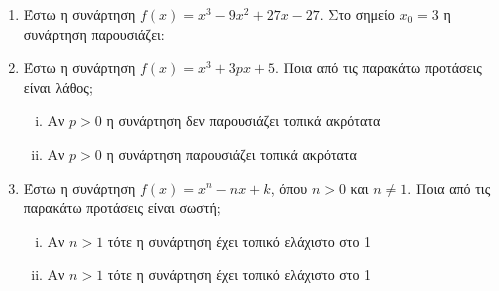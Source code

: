 \begin{enumerate}

  \item Έστω η συνάρτηση $ f(x) = x^{3} - 9x^{2}+27x-27 $. Στο σημείο $ x_{0} = 3 $ η 
    συνάρτηση παρουσιάζει:


  \item Έστω η συνάρτηση $ f(x) = x^{3}+3px+5 $. Ποια από τις παρακάτω προτάσεις είναι 
    λάθος;

    \begin{enumerate}[i)]
      \item Αν $ p>0 $ η συνάρτηση δεν παρουσιάζει τοπικά ακρότατα
      \item Αν $ p>0 $ η συνάρτηση παρουσιάζει τοπικά ακρότατα
    \end{enumerate}

  \item Έστω η συνάρτηση $ f(x) = x^{n}-nx+k $, όπου $ n>0 $ και $ n \neq 1 $. 
    Ποια από τις παρακάτω προτάσεις είναι σωστή;

    \begin{enumerate}[i)]
      \item Αν $ n>1 $ τότε η συνάρτηση έχει τοπικό ελάχιστο στο 1
      \item Αν $ n>1 $ τότε η συνάρτηση έχει τοπικό ελάχιστο στο 1
    \end{enumerate}
\end{enumerate}



  
